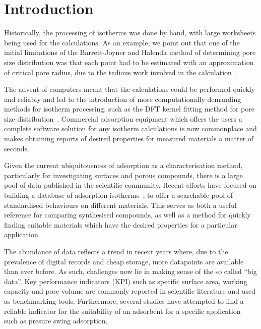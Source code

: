 
\section{Introduction}

Historically, the processing of isotherms was done by hand, with large 
worksheets being used for the calculations. As an example, 
we point out that one of the initial limitations of the 
Barrett-Joyner and Halenda method of determining pore size distribution
was that each point had to be estimated with an approximation of critical
pore radius, due to the tedious work involved in the
calculation~\cite{barrettDeterminationPoreVolume1951}.

The advent of computers meant that the calculations could be performed
quickly and reliably and led to the introduction of more computationally
demanding methods for isotherm processing, such as the DFT kernel fitting
method for pore size distribution~\cite{seatonNewAnalysisMethod1989,%
tarazonaPhaseEquilibriaFluid1987}. 
Commercial adsorption equipment which offers the users
a complete software solution for any isotherm calculations is now
commonplace and makes obtaining reports of desired properties
for measured materials a matter of seconds.

Given the current ubiquitousness of adsorption as a characterisation method,
particularly for investigating surfaces and porous compounds,
there is a large pool of data published in the scientific community.
Recent efforts have focused on building a database of adsorption 
isotherms~\cite{sideriusNISTARPAEDatabase2015}, to offer a searchable
pool of standardised behaviours on different materials. This serves as 
both a useful reference for comparing synthesised compounds, as well as a
method for quickly finding suitable materials which have the
desired properties for a particular application.

The abundance of data reflects a trend in recent years where, due
to the prevalence of digital records and cheap storage, more
datapoints are available than ever before. As such, challenges
now lie in making sense of the so called ``big data''.
Key performance indicators (KPI) such as specific surface area, working 
capacity and pore volume are commonly reported in scientific literature
and used as benchmarking tools. Furthermore,
several studies have attempted to find a reliable indicator for
the suitability of an adsorbent for a specific
application~\cite{regeSimpleParameterSelecting2001, %
ackley2000psa,%
wiersumAdsorbentPerformanceIndicator2013} such as presure swing 
adsorption.


